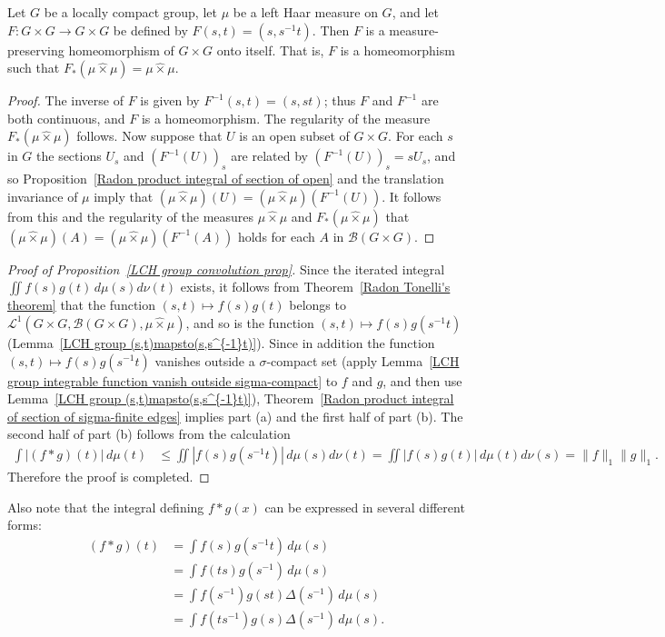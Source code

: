 \begin{lemma}\label{LCH group (s,t)mapsto(s,s^{-1}t)}
Let $G$ be a locally compact group, let $\mu$ be a left Haar measure on $G$, and let $F:G\times G\to G\times G$ be defined by $F(s,t)=(s,s^{-1}t)$. Then $F$ is a measure-preserving homeomorphism of $G\times G$ onto itself. That is, $F$ is a homeomorphism such that $F_*(\mu\hat{\times}\mu)=\mu\hat{\times}\mu$.
\end{lemma}
\begin{proof}
The inverse of $F$ is given by $F^{-1}(s,t)=(s,st)$; thus $F$ and $F^{-1}$ are both continuous, and $F$ is a homeomorphism. The regularity of the measure $F_*(\mu\hat{\times}\mu)$ follows. Now suppose that $U$ is an open subset of $G\times G$. For each $s$ in $G$ the sections $U_s$ and $(F^{-1}(U))_s$ are related by $(F^{-1}(U))_s=sU_s$, and so Proposition~\ref{Radon product integral of section of open} and the translation invariance of $\mu$ imply that $(\mu\hat{\times}\mu)(U)=(\mu\hat{\times}\mu)(F^{-1}(U))$. It follows from this and the regularity of the measures $\mu\hat{\times}\mu$ and $F_*(\mu\hat{\times}\mu)$ that $(\mu\hat{\times}\mu)(A)=(\mu\hat{\times}\mu)(F^{-1}(A))$ holds for each $A$ in $\mathcal{B}(G\times G)$.
\end{proof}
\begin{proof}[Proof of Proposition~\ref{LCH group convolution prop}]
Since the iterated integral $\iint f(s)g(t)\,d\mu(s)d\nu(t)$ exists, it follows from Theorem~\ref{Radon Tonelli's theorem} that the function $(s,t)\mapsto f(s)g(t)$ belongs to $\mathcal{L}^1(G\times G,\mathcal{B}(G\times G),\mu\hat{\times}\mu)$, and so is the function $(s,t)\mapsto f(s)g(s^{-1}t)$ (Lemma~\ref{LCH group (s,t)mapsto(s,s^{-1}t)}). Since in addition the function $(s,t)\mapsto f(s)g(s^{-1}t)$ vanishes outside a $\sigma$-compact set (apply Lemma~\ref{LCH group integrable function vanish outside sigma-compact} to $f$ and $g$, and then use Lemma~\ref{LCH group (s,t)mapsto(s,s^{-1}t)}), Theorem~\ref{Radon product integral of section of sigma-finite edges} implies part (a) and the first half of part (b). The second half of part (b) follows from the calculation
\begin{align*}
\int|(f\ast g)(t)|\,d\mu(t)&\leq\iint|f(s)g(s^{-1}t)|\,d\mu(s)d\nu(t)=\iint|f(s)g(t)|\,d\mu(t)d\nu(s)=\|f\|_1\|g\|_1.
\end{align*}
Therefore the proof is completed.
\end{proof}
Also note that the integral defining $f\ast g(x)$ can be expressed in several different forms:
\begin{equation}\label{LCH group convolution L^1(G) defining}
\begin{aligned}
(f\ast g)(t)&=\int f(s)g(s^{-1}t)\,d\mu(s)\\
&=\int f(ts)g(s^{-1})\,d\mu(s)\\
&=\int f(s^{-1})g(st)\Delta(s^{-1})\,d\mu(s)\\
&=\int f(ts^{-1})g(s)\Delta(s^{-1})\,d\mu(s).
\end{aligned}
\end{equation}
